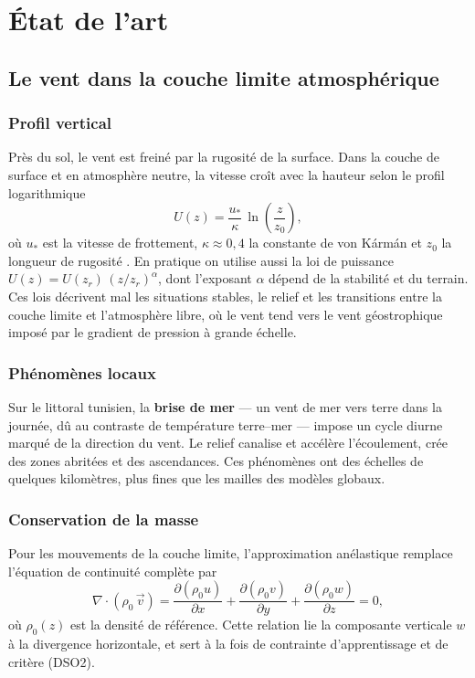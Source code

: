 \chapter{État de l'art}
\label{chap:etat}

\section{Le vent dans la couche limite atmosphérique}

\subsection{Profil vertical}
Près du sol, le vent est freiné par la rugosité de la surface. Dans la couche de surface et en
atmosphère neutre, la vitesse croît avec la hauteur selon le profil logarithmique
\begin{equation}
  U(z) = \frac{u_*}{\kappa}\,\ln\!\left(\frac{z}{z_0}\right),
\end{equation}
où $u_*$ est la vitesse de frottement, $\kappa \approx 0{,}4$ la constante de von Kármán et $z_0$
la longueur de rugosité \citep{stull1988}. En pratique on utilise aussi la loi de puissance
$U(z) = U(z_r)\,(z/z_r)^{\alpha}$, dont l'exposant $\alpha$ dépend de la stabilité et du terrain.
Ces lois décrivent mal les situations stables, le relief et les transitions entre la couche limite
et l'atmosphère libre, où le vent tend vers le vent géostrophique imposé par le gradient de
pression à grande échelle.

\subsection{Phénomènes locaux}
Sur le littoral tunisien, la \textbf{brise de mer} --- un vent de mer vers terre dans la journée,
dû au contraste de température terre--mer --- impose un cycle diurne marqué de la direction du vent.
Le relief canalise et accélère l'écoulement, crée des zones abritées et des ascendances. Ces
phénomènes ont des échelles de quelques kilomètres, plus fines que les mailles des modèles globaux.

\subsection{Conservation de la masse}
Pour les mouvements de la couche limite, l'approximation anélastique \citep{ogura1962} remplace
l'équation de continuité complète par
\begin{equation}
  \nabla\cdot(\rho_0\,\vec v) = \frac{\partial(\rho_0 u)}{\partial x}
  + \frac{\partial(\rho_0 v)}{\partial y} + \frac{\partial(\rho_0 w)}{\partial z} = 0,
  \label{eq:anelastique}
\end{equation}
où $\rho_0(z)$ est la densité de référence. Cette relation lie la composante verticale $w$ à la
divergence horizontale, et sert à la fois de contrainte d'apprentissage et de critère (DSO2).

